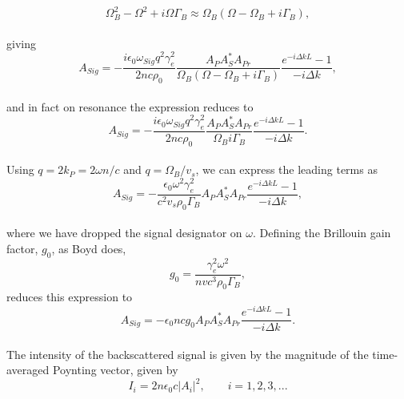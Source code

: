 \\
\begin{equation}
\Omega_{B}^{2} - \Omega^{2} + i\Omega\Gamma_{B} \approx \Omega_{B}(\Omega - \Omega_{B} + i\Gamma_{B}),
\end{equation}
\\
giving
\\
\begin{equation}
  A_{Sig} = -\frac{i\epsilon_{0}\omega_{Sig}q^{2}\gamma_{e}^{2}}{2nc\rho_{0}}\frac{A_{P}A_{S}^{*}A_{Pr}}{\Omega_{B}(\Omega - \Omega_{B} + i\Gamma_{B})} \frac{e^{-i\Delta kL} - 1}{-i\Delta k},
  \label{eq:resonance}
\end{equation}
\\
and in fact on resonance the expression reduces to
\\
\begin{equation}
  A_{Sig} = -\frac{i\epsilon_{0}\omega_{Sig}q^{2}\gamma_{e}^{2}}{2nc\rho_{0}}\frac{A_{P}A_{S}^{*}A_{Pr}}{\Omega_{B}i\Gamma_{B}} \frac{e^{-i\Delta kL} - 1}{-i\Delta k}.
\end{equation}
\\
Using \(q = 2k_{P} = 2\omega n/c\) and \(q = \Omega_{B}/v_{s}\), we can express the leading terms as
\\
\begin{equation}
  A_{Sig} = -\frac{\epsilon_{0}\omega^{2}\gamma_{e}^{2}}{c^{2}v_{s}\rho_{0}\Gamma_{B}}A_{P}A_{S}^{*}A_{Pr} \frac{e^{-i\Delta kL} - 1}{-i\Delta k},
\end{equation}
\\
where we have dropped the signal designator on \(\omega\). Defining the Brillouin gain factor, \(g_{0}\), as Boyd does,
\\
\begin{equation}
  g_{0} = \frac{\gamma_{e}^{2}\omega^{2}}{nvc^{3}\rho_{0}\Gamma_{B}},
\end{equation}
reduces this expression to
\\
\begin{equation}
  A_{Sig} = -\epsilon_{0}ncg_{0}A_{P}A_{S}^{*}A_{Pr} \frac{e^{-i\Delta kL} - 1}{-i\Delta k}.
\end{equation}
\\
The intensity of the backscattered signal is given by the magnitude of the time-averaged Poynting vector, given by
\\
\begin{equation}
  I_{i} = 2n\epsilon_{0}c|A_{i}|^{2}, \qquad i = 1,2,3,...
\end{equation}
\\
